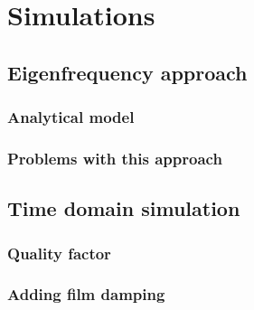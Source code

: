 \section{Simulations}
\subsection{Eigenfrequency approach}
\subsubsection{Analytical model}
\subsubsection{Problems with this approach}

\subsection{Time domain simulation}
\subsubsection{Quality factor}
\subsubsection{Adding film damping}
